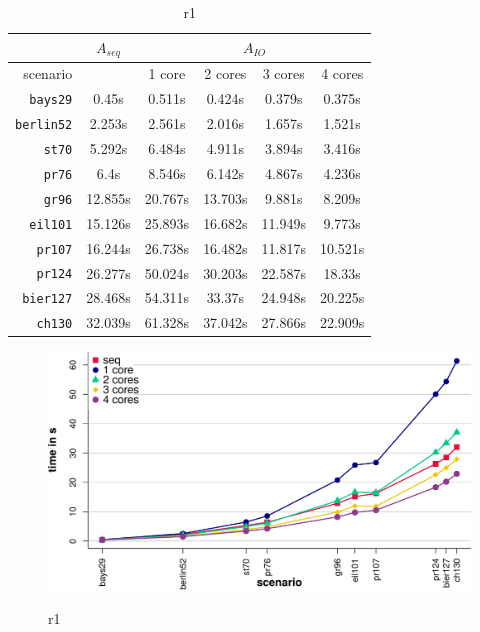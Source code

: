 \begin{table}[h!]
  \centering
  \begin{tabular}{r|c||c|c|c|c|}
    \cline{2-6}
    & \multicolumn{1}{c||}{$A_{seq}$} & \multicolumn{4}{c|}{$A_{IO}$} \\
    \hline
    \multicolumn{1}{|r||}{scenario} & & 1 core & 2 cores & 3 cores & 4 cores \\
    \hline
    \hline
    \multicolumn{1}{|r||}{\texttt{bays29}} & 0.45s & 0.511s & 0.424s & 0.379s & 0.375s \\
    \hline
    \multicolumn{1}{|r||}{\texttt{berlin52}} & 2.253s & 2.561s & 2.016s & 1.657s & 1.521s \\
    \hline
    \multicolumn{1}{|r||}{\texttt{st70}} & 5.292s & 6.484s & 4.911s & 3.894s & 3.416s \\
    \hline
    \multicolumn{1}{|r||}{\texttt{pr76}} & 6.4s & 8.546s & 6.142s & 4.867s & 4.236s \\
    \hline
    \multicolumn{1}{|r||}{\texttt{gr96}} & 12.855s & 20.767s & 13.703s & 9.881s & 8.209s \\
    \hline
    \multicolumn{1}{|r||}{\texttt{eil101}} & 15.126s & 25.893s & 16.682s & 11.949s & 9.773s \\
    \hline
    \multicolumn{1}{|r||}{\texttt{pr107}} & 16.244s & 26.738s & 16.482s & 11.817s & 10.521s \\
    \hline
    \multicolumn{1}{|r||}{\texttt{pr124}} & 26.277s & 50.024s & 30.203s & 22.587s & 18.33s \\
    \hline
    \multicolumn{1}{|r||}{\texttt{bier127}} & 28.468s & 54.311s & 33.37s & 24.948s & 20.225s \\
    \hline
    \multicolumn{1}{|r||}{\texttt{ch130}} & 32.039s & 61.328s & 37.042s & 27.866s & 22.909s \\
    \hline
  \end{tabular}
  \caption{r1}
  \label{tbl:variation_ameisenanzahl}
\end{table}


\begin{figure}[h!]
  \centering
  \includegraphics[width=\textwidth]{img/test_local.pdf}
  \label{fig:test_local_1}
  \caption{r1}
\end{figure}


